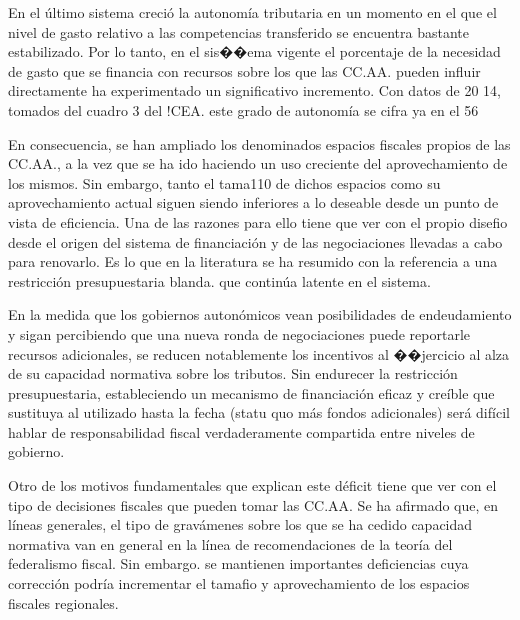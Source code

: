 \documentclass[10pt,a4paper]{article}
\begin{document}
En el último sistema creció la autonomía tributaria en un momento en el que el nivel de gasto relativo a las competencias transferido se encuentra bastante estabilizado. Por lo tanto, en el sis��ema vigente el porcentaje de la necesidad de gasto que se financia con recursos sobre los que las CC.AA. pueden influir directamente ha experimentado un significativo incremento. Con datos de 20 14, tomados del cuadro 3 del !CEA. este grado de autonomía se cifra ya en el 56%

En consecuencia, se han ampliado los denominados espacios fiscales propios de las CC.AA., a la vez que se ha ido haciendo un uso creciente del aprovechamiento de los mismos. Sin embargo, tanto el tama110 de dichos espacios como su aprovechamiento actual siguen siendo inferiores a lo deseable desde un punto de vista de eficiencia. Una de las razones para ello tiene que ver con el propio disefio desde el origen del sistema de financiación y de las negociaciones llevadas a cabo para renovarlo. Es lo que en la literatura se ha resumido con la referencia a una restricción presupuestaria blanda. que continúa latente en el sistema.

En la medida que los gobiernos autonómicos vean posibilidades de endeudamiento y sigan percibiendo que una nueva ronda de negociaciones puede reportarle recursos adicionales, se reducen notablemente los incentivos al ��jercicio al alza de su capacidad normativa sobre los tributos. Sin endurecer la restricción presupuestaria, estableciendo un mecanismo de financiación eficaz y creíble que sustituya al utilizado hasta la fecha (statu quo más fondos adicionales) será difícil hablar de responsabilidad fiscal verdaderamente compartida entre niveles de gobierno.

Otro de los motivos fundamentales que explican este déficit tiene que ver con el tipo de decisiones fiscales que pueden tomar las CC.AA. Se ha afirmado que, en líneas generales, el tipo de gravámenes sobre los que se ha cedido capacidad normativa van en general en la línea de recomendaciones de la teoría del federalismo fiscal. Sin embargo. se mantienen importantes deficiencias cuya corrección podría incrementar el tamafio y aprovechamiento de los espacios fiscales regionales.
\end{document}
